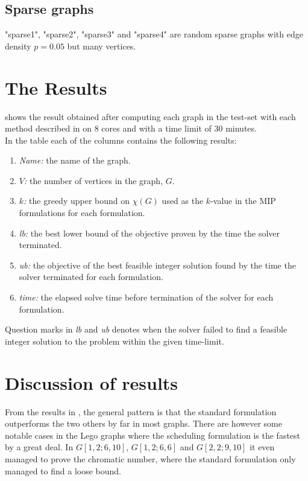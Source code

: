 \subsection{Sparse graphs}
"sparse1", "sparse2", "sparse3" and "sparse4" are random sparse graphs with edge density $p=0.05$ but many vertices. 
\section{The Results}
 shows the result obtained after computing each graph in the test-set with each method described in  on 8 cores and with a time limit of 30 minutes. \\
In the table each of the columns contains the following results:
\begin{enumerate}
\item \textit{Name:} the name of the graph.
\item \textit{$V$:} the number of vertices in the graph, $G$.
\item \textit{$k$:} the greedy upper bound on $\chi(G)$ used as the $k$-value in the MIP formulations for each formulation.
\item \textit{lb:} the best lower bound of the objective proven by the time the solver terminated.
\item \textit{ub:} the objective of the best feasible integer solution found by the time the solver terminated for each formulation.
\item \textit{time:} the elapsed solve time before termination of the solver for each formulation.
\end{enumerate}
\noindent Question marks in \textit{lb} and \textit{ub} denotes when the solver failed to find a feasible integer solution to the problem within the given time-limit.

\begin{scriptsize}

\end{scriptsize}
\section{Discussion of results}
From the results in , the general pattern is that the standard formulation outperforms the two others by far in most graphs. There are however some notable cases in the Lego graphs where the scheduling formulation is the fastest by a great deal. In $G[1,2;6,10]$, $G[1,2;6,6]$ and $G[2,2;9,10]$ it even managed to prove the chromatic number, where the standard formulation only managed to find a loose bound.

